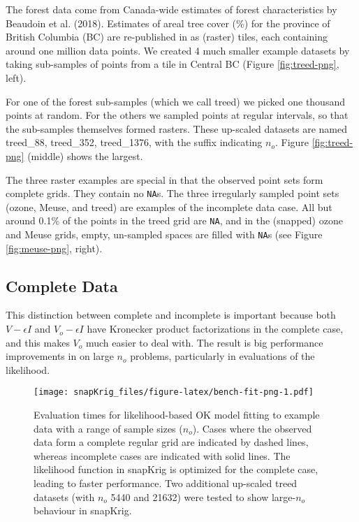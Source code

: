 The forest data come from Canada-wide estimates of forest characteristics by Beaudoin et al. (2018). Estimates of areal tree cover (\%) for the province of British Columbia (BC) are re-published in  as (raster) tiles, each containing around one million data points. We created 4 much smaller example datasets by taking sub-samples of points from a tile in Central BC (Figure \ref{fig:treed-png}, left).

For one of the forest sub-samples (which we call treed) we picked one thousand points at random. For the others we sampled points at regular intervals, so that the sub-samples themselves formed rasters. These up-scaled datasets are named treed\_88, treed\_352, treed\_1376, with the suffix indicating \(n_o\). Figure \ref{fig:treed-png} (middle) shows the largest.

The three raster examples are special in that the observed point sets form complete grids. They contain no \texttt{NA}s. The three irregularly sampled point sets (ozone, Meuse, and treed) are examples of the incomplete data case. All but around 0.1\% of the points in the treed grid are \texttt{NA}, and in the (snapped) ozone and Meuse grids, empty, un-sampled spaces are filled with \texttt{NA}s (see Figure \ref{fig:meuse-png}, right).

\hypertarget{complete-data}{%
\subsection{Complete Data}\label{complete-data}}

This distinction between complete and incomplete is important because both \(V - \epsilon I\) and \(V_o - \epsilon I\) have Kronecker product factorizations in the complete case, and this makes \(V_o\) much easier to deal with. The result is big performance improvements in  on large \(n_o\) problems, particularly in evaluations of the likelihood.

\begin{figure}
\centering
\texttt{[image: snapKrig\_files/figure-latex/bench-fit-png-1.pdf]}
\caption{\label{fig:bench-fit-png}Evaluation times for likelihood-based OK model fitting to example data with a range of sample sizes (\(n_o\)). Cases where the observed data form a complete regular grid are indicated by dashed lines, whereas incomplete cases are indicated with solid lines. The likelihood function in snapKrig is optimized for the complete case, leading to faster performance. Two additional up-scaled treed datasets (with \(n_o\) 5440 and 21632) were tested to show large-\(n_o\) behaviour in snapKrig.}
\end{figure}

